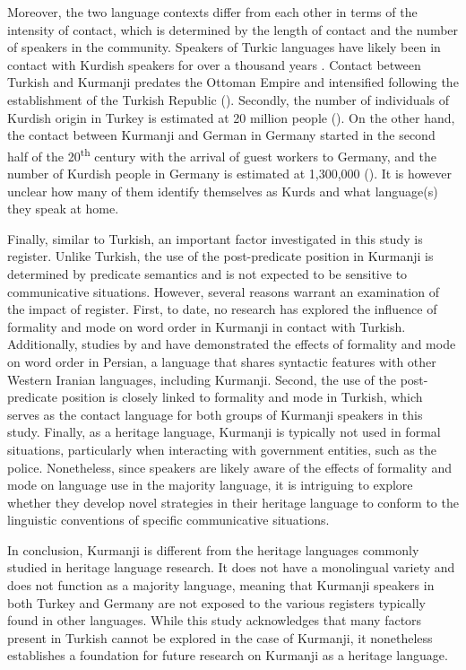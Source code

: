 Moreover, the two language contexts differ from each other in terms of the intensity of contact, which is determined by the length of contact and the number of speakers in the community. Speakers of Turkic languages have likely been in contact with Kurdish speakers for over a thousand years \citep{Haig2023}. Contact between Turkish and Kurmanji predates the Ottoman Empire and intensified following the establishment of the Turkish Republic (\citealt{Yagmur2001}). Secondly, the number of individuals of Kurdish origin in Turkey is estimated at 20 million people (\citealt{Kurdish2017}). On the other hand, the contact between Kurmanji and German in Germany started in the second half of the 20\textsuperscript{th} century with the arrival of guest workers to Germany, and the number of Kurdish people in Germany is estimated at 1,300,000 (\citealt{GhaderiAlmstadt2023}). It is however unclear how many of them identify themselves as Kurds and what language(s) they speak at home.

Finally, similar to Turkish, an important factor investigated in this study is register. Unlike Turkish, the use of the post-predicate position in Kurmanji is determined by predicate semantics and is not expected to be sensitive to communicative situations. However, several reasons warrant an examination of the impact of register. First, to date, no research has explored the influence of formality and mode on word order in Kurmanji in contact with Turkish. Additionally, studies by \citet{Frommer1981} and \citet{Haig_post-predicate_EtAl2024-1} have demonstrated the effects of formality and mode on word order in Persian, a language that shares syntactic features with other Western Iranian languages, including Kurmanji. Second, the use of the post-predicate position is closely linked to formality and mode in Turkish, which serves as the contact language for both groups of Kurmanji speakers in this study. Finally, as a heritage language, Kurmanji is typically not used in formal situations, particularly when interacting with government entities, such as the police. Nonetheless, since speakers are likely aware of the effects of formality and mode on language use in the majority language, it is intriguing to explore whether they develop novel strategies in their heritage language to conform to the linguistic conventions of specific communicative situations.

In conclusion, Kurmanji is different from the heritage languages commonly studied in heritage language research. It does not have a monolingual variety and does not function as a majority language, meaning that Kurmanji speakers in both Turkey and Germany are not exposed to the various registers typically found in other languages. While this study acknowledges that many factors present in Turkish cannot be explored in the case of Kurmanji, it nonetheless establishes a foundation for future research on Kurmanji as a heritage language.

